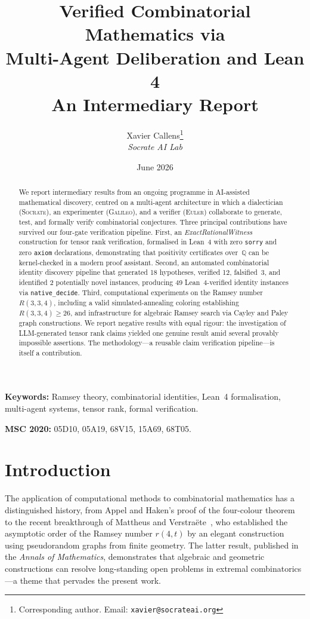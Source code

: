 \documentclass[11pt,a4paper]{article}
\title{%
  \textbf{Verified Combinatorial Mathematics via\\
  Multi-Agent Deliberation and Lean 4}\\[6pt]
  \large An Intermediary Report
}
\author{%
  Xavier Callens\thanks{Corresponding author. Email: \texttt{xavier@socrateai.org}} \\
  \textit{Socrate AI Lab}
}
\date{June 2026}
\begin{document}
\maketitle

\begin{abstract}
We report intermediary results from an ongoing programme in AI-assisted
mathematical discovery, centred on a multi-agent architecture in which a
dialectician (\textsc{Socrate}), an experimenter (\textsc{Galileo}), and a
verifier (\textsc{Euler}) collaborate to generate, test, and formally verify
combinatorial conjectures. Three principal contributions have survived our
four-gate verification pipeline. First, an \emph{ExactRationalWitness}
construction for tensor rank verification, formalised in Lean~4 with zero
\texttt{sorry} and zero \texttt{axiom} declarations, demonstrating that
positivity certificates over~$\mathbb{Q}$ can be kernel-checked in a modern
proof assistant. Second, an automated combinatorial identity discovery pipeline
that generated 18 hypotheses, verified 12, falsified~3, and identified 2
potentially novel instances, producing 49 Lean~4-verified identity instances
via \texttt{native\_decide}. Third, computational experiments on the Ramsey
number $R(3,3,4)$, including a valid simulated-annealing coloring
establishing $R(3,3,4) \geq 26$, and infrastructure for algebraic Ramsey
search via Cayley and Paley graph constructions. We report negative results
with equal rigour: the investigation of LLM-generated tensor rank claims
yielded one genuine result amid several provably impossible assertions. The
methodology---a reusable claim verification pipeline---is itself a
contribution.
\end{abstract}

\vspace{1em}
\noindent\textbf{Keywords:} Ramsey theory, combinatorial identities, Lean~4
formalisation, multi-agent systems, tensor rank, formal verification.

\vspace{0.5em}
\noindent\textbf{MSC 2020:} 05D10, 05A19, 68V15, 15A69, 68T05.

\section{Introduction}\label{sec:intro}

The application of computational methods to combinatorial mathematics has a
distinguished history, from Appel and Haken's proof of the four-colour
theorem~\cite{appel1977} to the recent breakthrough of Mattheus and
Verstraëte~\cite{mattheus2024}, who established the asymptotic order of the
Ramsey number $r(4,t)$ by an elegant construction using pseudorandom graphs
from finite geometry. The latter result, published in the \emph{Annals of
Mathematics}, demonstrates that algebraic and geometric constructions can
resolve long-standing open problems in extremal combinatorics---a theme that
pervades the present work.
\end{document}
